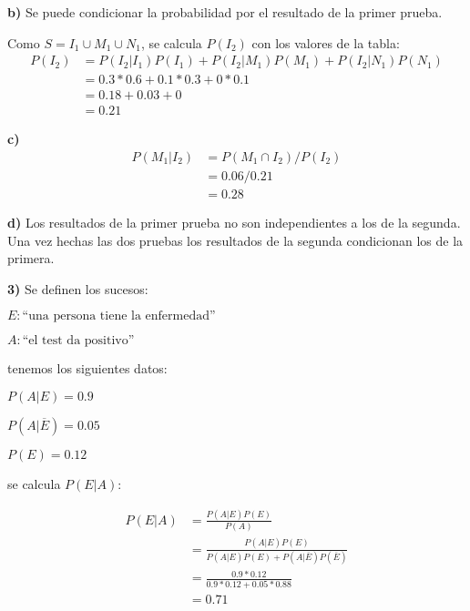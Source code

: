 \documentclass[12pt]{article}
\begin{document}
\textbf{b)}
Se puede condicionar la probabilidad por el resultado de la primer prueba.

Como $S=I_1 \cup M_1 \cup N_1$, se calcula $P(I_2)$ con los valores de la tabla:
\begin{align*}
  P(I_2)&=P(I_2|I_1)P(I_1)+P(I_2|M_1)P(M_1)+P(I_2|N_1)P(N_1)\\
        &=0.3*0.6+0.1*0.3+0*0.1\\
        &=0.18+0.03+0\\
        &=0.21
\end{align*}

\textbf{c)}
\begin{align*}
  P(M_1|I_2)&=P(M_1 \cap I_2)/P(I_2)\\
            &=0.06/0.21\\
            &=0.28
\end{align*}

\textbf{d)}
Los resultados de la primer prueba no son independientes a los de la segunda. Una vez hechas las dos pruebas los resultados de la segunda condicionan los de la primera.

\textbf{3)}
Se definen los sucesos:

$E: \textrm{``una persona tiene la enfermedad''}$

$A: \textrm{``el test da positivo''}$

tenemos los siguientes datos:

$P(A|E)=0.9$

$P(A|\overline{E})=0.05$

$P(E)=0.12$

se calcula $P(E|A)$:

\begin{align*}
  P(E|A)&=\frac{P(A|E)P(E)}{P(A)}\\
        &=\frac{P(A|E)P(E)}{P(A|E)P(E)+P(A|\overline{E})P(\overline{E})}\\
        &=\frac{0.9*0.12}{0.9*0.12+0.05*0.88}\\
        &=0.71
\end{align*}
\end{document}
